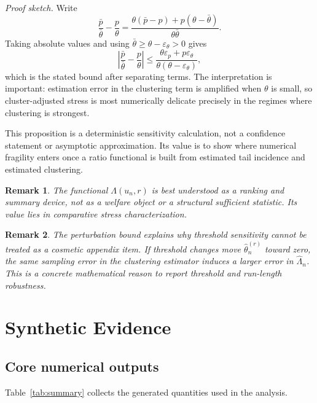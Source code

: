 \documentclass[11pt]{article}
\newtheorem{remark}{Remark}
\begin{document}
\textit{Proof sketch.}
Write
\[
\frac{\bar{p}}{\bar{\theta}}-\frac{p}{\theta}
=
\frac{\theta(\bar{p}-p)+p(\theta-\bar{\theta})}{\theta\bar{\theta}}.
\]
Taking absolute values and using $\bar{\theta}\ge \theta-\varepsilon_\theta>0$ gives
\[
\left|\frac{\bar{p}}{\bar{\theta}}-\frac{p}{\theta}\right|
\le
\frac{\theta\varepsilon_p+p\varepsilon_\theta}{\theta(\theta-\varepsilon_\theta)},
\]
which is the stated bound after separating terms. The interpretation is important: estimation error in the clustering term is amplified when $\theta$ is small, so cluster-adjusted stress is most numerically delicate precisely in the regimes where clustering is strongest.

This proposition is a deterministic sensitivity calculation, not a confidence statement or asymptotic approximation. Its value is to show where numerical fragility enters once a ratio functional is built from estimated tail incidence and estimated clustering.

\begin{remark}
The functional $\Lambda(u_n,r)$ is best understood as a ranking and summary device, not as a welfare object or a structural sufficient statistic. Its value lies in comparative stress characterization.
\end{remark}

\begin{remark}
The perturbation bound explains why threshold sensitivity cannot be treated as a cosmetic appendix item. If threshold changes move $\widehat{\theta}_n^{(r)}$ toward zero, the same sampling error in the clustering estimator induces a larger error in $\widehat{\Lambda}_n$. This is a concrete mathematical reason to report threshold and run-length robustness.
\end{remark}

\section{Synthetic Evidence}

\subsection{Core numerical outputs}

Table~\ref{tab:summary} collects the generated quantities used in the analysis.
\end{document}
